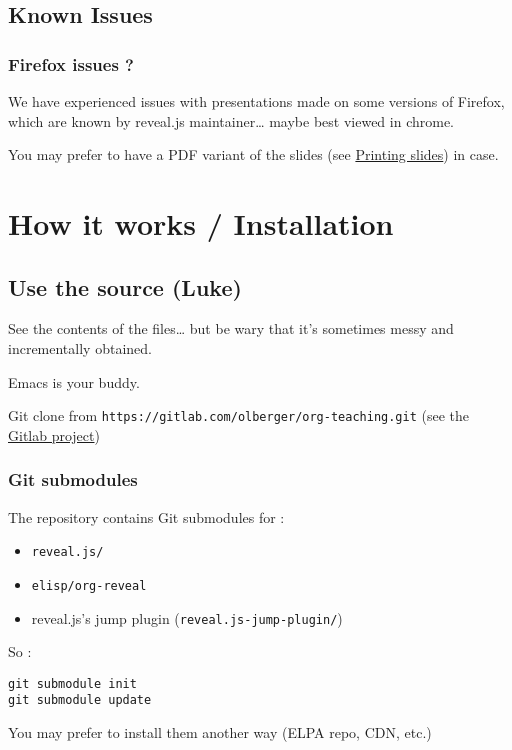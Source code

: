 \documentclass[a4paper]{article}
\begin{document}
\subsection{Known Issues}
\label{sec:org687196c}

\subsubsection{Firefox issues ?}
\label{sec:orgcc72e4b}

We have experienced issues with presentations made on some versions of Firefox, which are known by reveal.js maintainer\ldots{} maybe best viewed in chrome.

You may prefer to have a PDF variant of the slides (see \hyperref[sec:org3d520e1]{Printing slides}) in case.



\section{How it works / Installation}
\label{sec:org5aab14f}
\subsection{Use the source (Luke)}
\label{sec:orgcae54db}

See the contents of the files\ldots{} but be wary that it's sometimes messy and incrementally obtained.

Emacs is your buddy.

Git clone from \texttt{https://gitlab.com/olberger/org-teaching.git} (see the \href{https://gitlab.com/olberger/org-teaching}{Gitlab project})

\subsubsection{Git submodules}
\label{sec:org9b5ee48}

The repository contains Git submodules for :
\begin{itemize}
\item \texttt{reveal.js/}
\item \texttt{elisp/org-reveal}
\item reveal.js's jump plugin (\texttt{reveal.js-jump-plugin/})
\end{itemize}

So :
\begin{verbatim}
git submodule init
git submodule update
\end{verbatim}
You may prefer to install them another way (ELPA repo, CDN, etc.)
\end{document}
